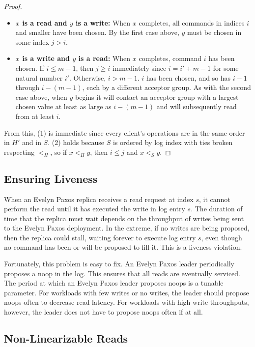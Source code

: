 \begin{proof}
\begin{itemize}
    \item \textbf{$x$ is a read and $y$ is a write:}
      When $x$ completes, all commands in indices $i$ and smaller have been
      chosen. By the first case above, $y$ must be chosen in some index $j >
      i$.

    \item \textbf{$x$ is a write and $y$ is a read:}
      When $x$ completes, command $i$ has been chosen. If $i \leq m-1$, then $j \geq
      i$ immediately since $i = i' + m - 1$ for some natural number $i'$.
      Otherwise, $i > m - 1$. $i$ has been chosen, and so has $i-1$ through
      $i-(m-1)$, each by a different acceptor group.
      As with the second case above, when $y$ begins it will contact an
      acceptor group with a largest chosen value at least as large as $i-(m-1)$
      and will subsequently read from at least $i$.
  \end{itemize}

  From this, (1) is immediate since every client's operations are in the same
  order in $H'$ and in $S$. (2) holds because $S$ is ordered by log index with
  ties broken respecting $<_H$, so if $x <_H y$, then $i \leq j$ and $x <_S y$.
\end{proof}

\subsection{Ensuring Liveness}
When an Evelyn Paxos replica receives a read request at index $s$, it cannot
perform the read until it has executed the write in log entry $s$. The duration
of time that the replica must wait depends on the throughput of writes being
sent to the Evelyn Paxos deployment. In the extreme, if no writes are being
proposed, then the replica could stall, waiting forever to execute log entry
$s$, even though no command has been or will be proposed to fill it. This is a
liveness violation.

Fortunately, this problem is easy to fix. An Evelyn Paxos leader periodically
proposes a noop in the log. This ensures that all reads are eventually
serviced. The period at which an Evelyn Paxos leader proposes noops is a
tunable parameter. For workloads with few writes or no writes, the leader
should propose noops often to decrease read latency. For workloads with high
write throughputs, however, the leader does not have to propose noops often if
at all.

\subsection{Non-Linearizable Reads}
